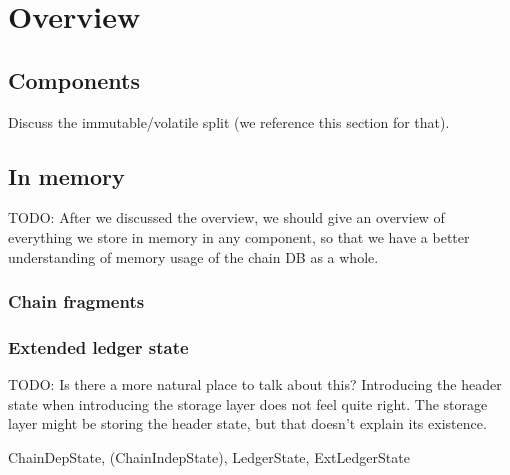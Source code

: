 \chapter{Overview}
\label{storage}

\section{Components}
\label{storage:components}


Discuss the immutable/volatile split (we reference this section for that).

\section{In memory}
\label{storage:inmemory}

TODO: After we discussed the overview, we should give an overview of everything
we store in memory in any component, so that we have a better understanding of
memory usage of the chain DB as a whole.

\subsection{Chain fragments}
\label{storage:fragments}

\subsection{Extended ledger state}
\label{storage:extledgerstate}
\label{storage:headerstate}

TODO: Is there a more natural place to talk about this? Introducing the
header state when introducing the storage layer does not feel quite right.
The storage layer might be storing the header state, but that doesn't
explain its existence.

ChainDepState, (ChainIndepState), LedgerState, ExtLedgerState
